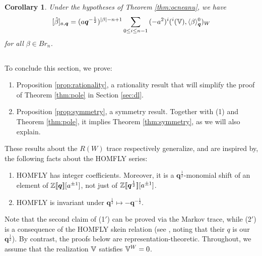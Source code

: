 \documentclass[a4paper,10pt,leqno]{amsart}
\theoremstyle{plain}
\theoremstyle{plain}
\theoremstyle{plain}
\newtheorem{cor}[thm]{Corollary}
\theoremstyle{definition}
\theoremstyle{remark}
\let\Alt\relax
\DeclareMathOperator{\Alt}{\text{$\Lambda$}}
\newcommand{\Br}{\mathit{Br}}
\newcommand{\Q}{\bm{q}}
\newcommand{\Tr}[1]{\langle{#1}\rangle_{\Q}}
\begin{document}
\begin{cor}\label{cor:homfly}
Under the hypotheses of Theorem \ref{thm:ocneanu}, we have
\begin{align}
{[\hat{\beta}]_{a, \Q}}
=	(a\Q^{-\frac{1}{2}})^{|\beta| - n + 1}
	\sum_{0 \leq i \leq n - 1}
	{(-a^2)^i}
	(\Alt^i(\bb{V}), \Tr{\beta}^0)_W
\end{align}
for all $\beta \in \Br_n$.
\end{cor}

\subsection{}

To conclude this section, we prove:
\begin{enumerate}
\item 	Proposition \ref{prop:rationality}, a rationality result that will simplify the proof of Theorem \ref{thm:pole} in Section \ref{sec:dl}.
\item 	Proposition \ref{prop:symmetry}, a symmetry result.
		Together with (1) and Theorem \ref{thm:pole}, it implies Theorem \ref{thm:symmetry}, as we will also explain.
\end{enumerate}
These results about the $R(W)$ trace respectively generalize, and are inspired by, the following facts about the HOMFLY series:
\begin{enumerate}
\item[(1$'$)] 	HOMFLY has integer coefficients.
		Moreover, it is a $\Q^{\frac{1}{2}}$-monomial shift of an element of $\bb{Z}[\![\Q]\!][a^{\pm 1}]$, not just of $\bb{Z}[\![\Q^{\frac{1}{2}}]\!][a^{\pm 1}]$.
\item[(2$'$)]	HOMFLY is invariant under $\Q^{\frac{1}{2}} \mapsto -\Q^{-\frac{1}{2}}$.
\end{enumerate}
Note that the second claim of (1$'$) can be proved via the Markov trace, while (2$'$) is a consequence of the HOMFLY skein relation (see \cite[\S{2.4}]{dgr}, noting that their $q$ is our $\Q^{\frac{1}{2}}$).
By contrast, the proofs below are representation-theoretic.
Throughout, we assume that the realization $\mathbb{V}$ satisfies $\mathbb{V}^W = 0$.

\subsubsection{}
\end{document}

